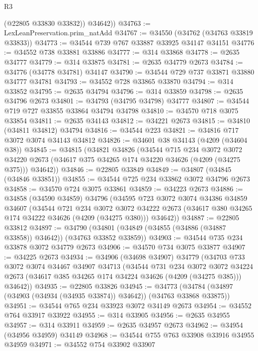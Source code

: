 \begin{lexlean}{R3}
\begin{coremodule}
          (@22805 @33830 @33832))
        @34642))
@34763 := LexLeanPreservation.prim_natAdd
@34767 := @34550 (@34762 (@34763 @33819 @33833))
@34773 := @34544 @739 @767 @33887 @33925 @34147 @34151
@34776 := @34552 @738 @33881 @33886
@34777 := @314 @33868
@34778 := @2635 @34777
@34779 := @314 @33875
@34781 := @2635 @34779 @2673
@34784 := @34776 (@34778 @34781) @34147
@34790 := @34544 @729 @737 @33871 @33880 @34777 @34781
@34793 := @34552 @728 @33865 @33870
@34794 := @314 @33852
@34795 := @2635 @34794
@34796 := @314 @33859
@34798 := @2635 @34796 @2673
@34801 := @34793 (@34795 @34798) @34777
@34807 := @34544 @719 @727 @33855 @33864 @34794 @34798
@34810 := @34570 @718 @3075 @33854
@34811 := @2635 @34143
@34812 := @34221 @2673
@34815 := @34810 (@34811 @34812) @34794
@34816 := @34544 @223
@34821 := @34816 @717 @3072 @3074 @34143 @34812
@34826 := @34601 @38 @34143 (@4209 (@34604 @38))
@34845 := @34815
    (@34821
      @34826
      (@34544
        @715
        @234
        @3072
        @3072
        @34220
        @2673
        (@34617 @375 @34265 @174 @34220 @34626 (@4209 (@34275 @375)))
        @34642))
@34846 := @22805 @33849
@34849 := @34807 (@34845 (@34846 @33851))
@34855 := @34544 @725 @234 @33862 @3072 @34796 @2673
@34858 := @34570 @724 @3075 @33861
@34859 := @34223 @2673
@34886 := @34858
    (@34590 @34859)
    @34796
    (@34595
      @723
      @3072
      @3074
      @34386
      @34859
      @34607
      (@34544
        @721
        @234
        @3072
        @3072
        @34222
        @2673
        (@34617 @380 @34265 @174 @34222 @34626 (@4209 (@34275 @380)))
        @34642))
@34887 := @22805 @33812
@34897 := @34790 (@34801 (@34849 (@34855 (@34886 (@34887 @33858)) @34642)) (@34763 @33852 @33859))
@34903 := @34544 @735 @234 @33878 @3072 @34779 @2673
@34906 := @34570 @734 @3075 @33877
@34907 := @34225 @2673
@34934 := @34906
    (@34698 @34907)
    @34779
    (@34703
      @733
      @3072
      @3074
      @34467
      @34907
      @34713
      (@34544
        @731
        @234
        @3072
        @3072
        @34224
        @2673
        (@34617 @385 @34265 @174 @34224 @34626 (@4209 (@34275 @385)))
        @34642))
@34935 := @22805 @33826
@34945 := @34773 (@34784 (@34897 (@34903 (@34934 (@34935 @33874)) @34642)) (@34763 @33868 @33875))
@34951 := @34544 @765 @234 @33923 @3072 @34149 @2673
@34954 := @34552 @764 @33917 @33922
@34955 := @314 @33905
@34956 := @2635 @34955
@34957 := @314 @33911
@34959 := @2635 @34957 @2673
@34962 := @34954 (@34956 @34959) @34149
@34968 := @34544 @755 @763 @33908 @33916 @34955 @34959
@34971 := @34552 @754 @33902 @33907

\end{coremodule}
\end{lexlean}

